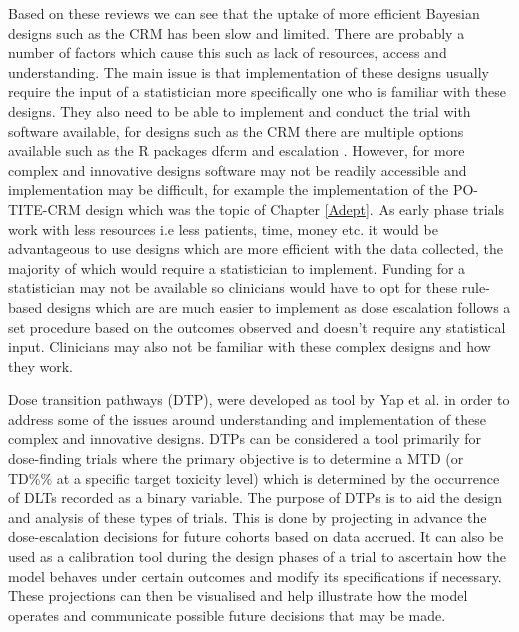 Based on these reviews we can see that the uptake of more efficient Bayesian designs such as the CRM has been slow and limited. There are probably a number of factors which cause this such as lack of resources, access and understanding. The main issue is that implementation of these designs usually require the input of a statistician more specifically one who is familiar with these designs. They also need to be able to implement and conduct the trial with software available, for designs such as the CRM there are multiple options available such as the R packages dfcrm \cite{cheungDfcrmDoseFindingContinual2019} and escalation \cite{brockModularApproachDose2020}. However, for more complex and innovative designs software may not be readily accessible and implementation may be difficult, for example the implementation of the PO-TITE-CRM design which was the topic of Chapter \ref{Adept}. As early phase trials work with less resources i.e less patients, time, money etc. it would be advantageous to use designs which are more efficient with the data collected, the majority of which would require a statistician to implement. Funding for a statistician may not be available so clinicians would have to opt for these rule-based designs which are are much easier to implement as dose escalation follows a set procedure based on the outcomes observed and doesn't require any statistical input. Clinicians may also not be familiar with these complex designs and how they work.  

Dose transition pathways (DTP), were developed as tool by Yap et al. \cite{yapDoseTransitionPathways2017} in order to address some of the issues around understanding and implementation of these complex and innovative designs. DTPs can be considered a tool primarily for dose-finding trials where the primary objective is to determine a MTD (or TD\%\% at a specific target toxicity level) which is determined by the occurrence of DLTs recorded as a binary variable. The purpose of DTPs is to aid the design and analysis of these types of trials. This is done by projecting in advance the dose-escalation decisions for future cohorts based on data accrued. It can also be used as a calibration tool during the design phases of a trial to ascertain how the model behaves under certain outcomes and modify its specifications if necessary. These projections can then be visualised and help illustrate how the model operates and communicate possible future decisions that may be made. 

